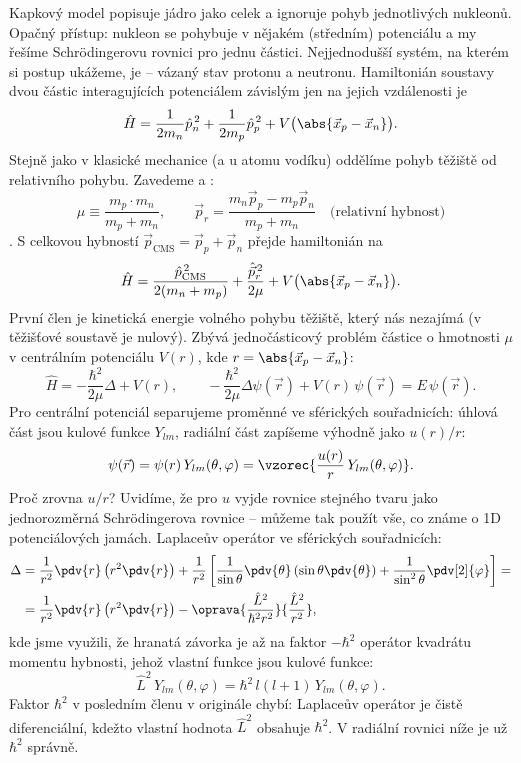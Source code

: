 Kapkový model popisuje jádro jako celek a ignoruje pohyb jednotlivých
nukleonů. Opačný přístup: nukleon se pohybuje v nějakém (středním)
potenciálu a my řešíme Schrödingerovu rovnici pro jednu částici. Nejjednodušší
systém, na kterém si postup ukážeme, je  -- vázaný stav protonu
a neutronu. Hamiltonián soustavy dvou částic interagujících potenciálem
závislým jen na jejich vzdálenosti je
\[
  \hat H = \frac{1}{2m_n}\hat p_n^{\,2} + \frac{1}{2m_p}\hat p_p^{\,2}
         + V\big(\abs{\vec x_p - \vec x_n}\big) .
\]
Stejně jako v klasické mechanice (a u atomu vodíku) oddělíme pohyb těžiště
od relativního pohybu. Zavedeme  a :
\[
  \mu \equiv \frac{m_p\cdot m_n}{m_p + m_n},
  \qquad
  \vec p_r = \frac{m_n\vec p_p - m_p\vec p_n}{m_p + m_n}
  \quad\text{(relativní hybnost)}
\]
.
S celkovou hybností \(\vec p_{\mathrm{CMS}} = \vec p_p + \vec p_n\) přejde
hamiltonián na
\[
  \hat H = \frac{\hat p_{\mathrm{CMS}}^{\,2}}{2(m_n + m_p)}
         + \frac{\hat{\vec p}_r^{\,2}}{2\mu}
         + V\big(\abs{\vec x_p - \vec x_n}\big) .
\]
První člen je kinetická energie volného pohybu těžiště, který nás
nezajímá (v těžišťové soustavě je nulový). Zbývá jednočásticový problém
 částice o hmotnosti \(\mu\) v centrálním potenciálu
\(V(r)\), kde \(r = \abs{\vec x_p - \vec x_n}\):
\[
  \hat H = -\frac{\hbar^2}{2\mu}\Delta + V(r),
  \qquad
  -\frac{\hbar^2}{2\mu}\Delta\psi(\vec r) + V(r)\,\psi(\vec r) = E\,\psi(\vec r) .
\]
Pro centrální potenciál separujeme proměnné ve sférických souřadnicích:
úhlová část jsou kulové funkce \(Y_{lm}\), radiální část zapíšeme výhodně
jako \(u(r)/r\):
\[
  \psi(\vec r) = \psi(r)\,Y_{lm}(\theta,\varphi)
  = \vzorec{\frac{u(r)}{r}\,Y_{lm}(\theta,\varphi)} .
\]
Proč zrovna \(u/r\)? Uvidíme, že pro \(u\) vyjde rovnice stejného tvaru jako
jednorozměrná Schrödingerova rovnice -- můžeme tak použít vše, co známe
o 1D potenciálových jamách. Laplaceův operátor ve sférických souřadnicích:
\begin{align*}
  \Delta &= \frac{1}{r^2}\pdv{r}\left(r^2\pdv{r}\right)
   + \frac{1}{r^2}\left[\frac{1}{\sin\theta}\pdv{\theta}\left(\sin\theta\pdv{\theta}\right)
   + \frac{1}{\sin^2\theta}\pdv[2]{\varphi}\right] = \\
  &= \frac{1}{r^2}\pdv{r}\left(r^2\pdv{r}\right) - \oprava{\frac{\hat L^2}{\hbar^2 r^2}}{\frac{\hat L^2}{r^2}},
\end{align*}
kde jsme využili, že hranatá závorka je až na faktor \(-\hbar^2\) operátor
kvadrátu momentu hybnosti, jehož vlastní funkce jsou kulové funkce:
\[
  \hat L^2\,Y_{lm}(\theta,\varphi) = \hbar^2\,l(l+1)\,Y_{lm}(\theta,\varphi) .
\]
Faktor \(\hbar^2\) v posledním členu v originále chybí: Laplaceův operátor je
čistě diferenciální, kdežto vlastní hodnota \(\hat L^2\) obsahuje \(\hbar^2\).
V radiální rovnici níže je už \(\hbar^2\) správně.

